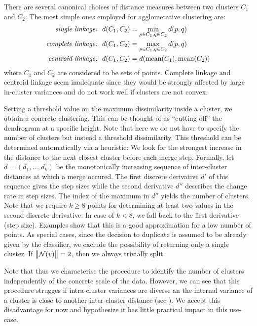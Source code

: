 \documentclass[
	fontsize=10pt, %
	twoside=false, %
	secnumdepth=1, %
  toc=indentunnumbered %
]{kaobook}
\begin{document}
There are several canonical choices of distance measures between two clusters $C_1$ and
$C_2$. The most simple ones employed for agglomerative clustering are:
\begin{align*}
  \text{{\textit{{single linkage:}}}} &~~ d(C_1, C_2) = \min_{p \in C_1, q \in C_2} d(p,q) \\
  \text{{\textit{{complete linkage:}}}} &~~ d(C_1, C_2) = \max_{p \in C_1, q \in C_2} d(p,q) \\
  \text{{\textit{{centroid linkage:}}}} &~~ d(C_1, C_2) = d(\text{mean}(C_1),\text{mean}(C_2))
\end{align*}
where $C_1$ and $C_2$ are considered to be sets of points. Complete linkage and
centroid linkage seem inadequate since they would be strongly affected by large
in-cluster variances and do not work well if clusters are not convex.

Setting a threshold value on the maximum dissimilarity inside a cluster, we
obtain a concrete clustering. This can be thought of as ``cutting off'' the
dendrogram at a specific height. Note that here we do not have to specify the
number of clusters but instead a threshold dissimilarity. This threshold can be
determined automatically via a heuristic:
We look for the strongest increase in the distance to
the next closest cluster before each merge step. Formally, let $d = (d_1, ..., d_k)$
be the monotonically increasing sequence of inter-cluster distances at which a
merge occured. The first discrete derivative $d'$ of this sequence gives the step
sizes while the second derivative $d''$ describes the change rate in step sizes. The
index of the maximum in $d''$ yields the number of clusters.
Note that we require $k \geq 8$ points for determining at least two values in the second
discrete derivative. In case of $k < 8$, we fall back to the first derivative
(step size). Examples show that this is a good approximation for a low number of points.
%
As special cases, since the decision to duplicate is assumed to be already given
by the classifier, we exclude the possibility of returning only a single
cluster. If~$\norm{\mathcal{N}(v)}=2$, then we always trivially split. 

Note that thus we characterise the procedure to identify the number of clusters
independently of the concrete scale of the data. However,
we can see that this procedure strugges if
intra-cluster variances are diverse an the internal variance of a
cluster is close to another inter-cluster distance (see ).
We accept this disadvantage
for now and hypothesize it has little practical impact in this use-case.
\end{document}
